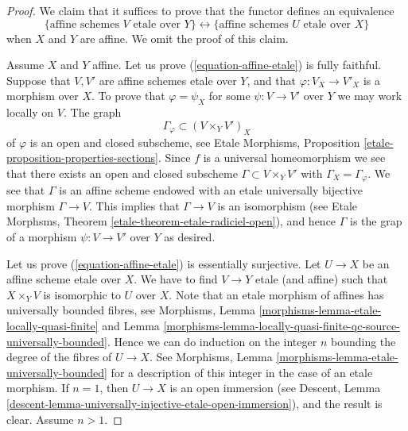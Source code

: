 \begin{proof}
We claim that it suffices to prove that the functor defines
an equivalence
\begin{equation}
\label{equation-affine-etale}
\{
\text{affine schemes }V\text{ etale over }Y
\}
\leftrightarrow
\{
\text{affine schemes }U\text{ etale over }X
\}
\end{equation}
when $X$ and $Y$ are affine. We omit the proof of this claim.

\medskip\noindent
Assume $X$ and $Y$ affine.
Let us prove (\ref{equation-affine-etale}) is fully faithful. Suppose that
$V, V'$ are affine schemes etale over $Y$, and that $\varphi : V_X \to V'_X$
is a morphism over $X$. To prove that $\varphi = \psi_X$ for some
$\psi : V \to V'$ over $Y$ we may work locally on $V$. The graph
$$
\Gamma_\varphi \subset (V \times_Y V')_X
$$
of $\varphi$ is an open and closed subscheme, see
Etale Morphisms, Proposition \ref{etale-proposition-properties-sections}.
Since $f$ is a universal homeomorphism we see that there exists an
open and closed subscheme $\Gamma \subset V \times_Y V'$ with
$\Gamma_X = \Gamma_\varphi$. We see that $\Gamma$ is an affine scheme
endowed with an etale universally bijective morphism $\Gamma \to V$.
This implies that $\Gamma \to V$ is an isomorphism (see
Etale Morphsms, Theorem \ref{etale-theorem-etale-radiciel-open}),
and hence $\Gamma$ is the grap of a morphism $\psi : V \to V'$ over $Y$
as desired.

\medskip\noindent
Let us prove (\ref{equation-affine-etale}) is essentially surjective.
Let $U \to X$ be an affine scheme etale over $X$.
We have to find $V \to Y$ etale (and affine) such that $X \times_Y V$
is isomorphic to $U$ over $X$. Note that an etale morphism of affines
has universally bounded fibres, see
Morphisms,
Lemma \ref{morphisms-lemma-etale-locally-quasi-finite} and
Lemma \ref{morphisms-lemma-locally-quasi-finite-qc-source-universally-bounded}.
Hence we can do induction on the integer $n$ bounding the degree of the fibres
of $U \to X$. See
Morphisms, Lemma \ref{morphisms-lemma-etale-universally-bounded}
for a description of this integer in the case of an etale morphism.
If $n = 1$, then $U \to X$ is an open immersion (see
Descent, Lemma \ref{descent-lemma-universally-injective-etale-open-immersion}),
and the result is clear. Assume $n > 1$.


\end{proof}
